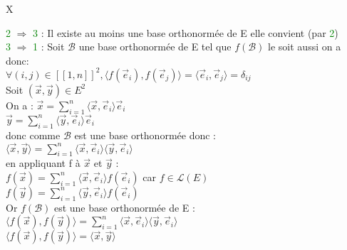 X\documentclass{article}
\begin{document}
\textcolor{green}{2} $\Rightarrow$ \textcolor{green}{3} : Il existe au moins une base orthonormée de E elle convient (par \textcolor{green}{2}) \\
\textcolor{green}{3} $\Rightarrow$ \textcolor{green}{1} : Soit $\mathcal B$ une base orthonormée de E tel que $f (\mathcal B)$ le soit aussi on a donc: \\
$\forall(i,j) \in [[1,n]]^2, \langle f(\vec e_i),f(\vec e_j) \rangle = \langle \vec e_i, \vec e_j \rangle =\delta_{ij}$ \\
Soit $(\vec x, \vec y) \in E^2$ \\
On a : $\vec x= \sum_{i=1}^n \langle \vec x, \vec e_i \rangle \vec e_i$ \\
$\vec y= \sum_{i=1}^n \langle \vec y, \vec e_i \rangle  \vec e_i$ \\
donc comme $\mathcal B$ est une base orthonormée donc : \\
$\langle \vec x, \vec y \rangle= \sum_{i=1}^n \langle \vec x, \vec e_i \rangle \langle \vec y, \vec e_i \rangle$ \\
en appliquant f à $\vec x$ et $\vec y$ : \\
$f(\vec x)=\sum_{i=1}^n \langle \vec x, \vec e_i \rangle f(\vec e_i)$ car $f\in \mathcal L(E)$ \\
$f(\vec y)= \sum_{i=1}^n \langle \vec y, \vec e_i \rangle f(\vec e_i)$ \\
Or $f(\mathcal B)$ est une base orthonormée de E : \\
$\langle f(\vec x), f(\vec y) \rangle = \sum_{i=1}^n \langle \vec x, \vec e_i \rangle \langle \vec y, \vec e_i \rangle$ \\
$\langle f(\vec x), f(\vec y) \rangle =\langle \vec x,\vec y \rangle $
\end{document}
